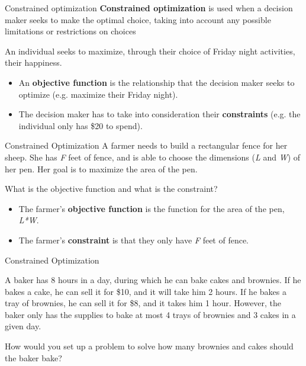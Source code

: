 \documentclass[12pt,t]{beamer}
\begin{document}
\begin{frame}{Constrained optimization}
  \textbf{Constrained optimization} is used when a decision maker seeks to make the optimal choice, taking into account any possible limitations or restrictions on choices

  \bigskip
  
  \bigskip
  An individual seeks to maximize, through their choice of Friday night activities, their happiness.

  \begin{itemize}
    \item An \textbf{objective function} is the relationship that the decision maker seeks to optimize (e.g. maximize their Friday night).
    \item  The decision maker has to take into consideration their \textbf{constraints} (e.g. the individual only has \$20 to spend).
  \end{itemize}
\end{frame}

\begin{frame}{Constrained Optimization}
  A farmer needs to build a rectangular fence for her sheep. She has \textit{F} feet of fence, and is able to choose the dimensions (\textit{L} and \textit{W}) of her pen. Her goal is to maximize the area of the pen.

  \bigskip
  What is the objective function and what is the constraint?

  \pause
  \begin{itemize}
    \item The farmer's \textbf{objective function} is the function for the area of the pen, \textit{L*W}.
    \item The farmer's \textbf{constraint} is that they only have \textit{F} feet of fence.
  \end{itemize}
\end{frame}

\begin{frame}{Constrained Optimization}

  \bigskip
  A baker has 8 hours in a day, during which he can bake cakes and brownies. If he bakes a cake, he can sell it for \$10, and it will take him 2 hours. If he bakes a tray of brownies, he can sell it for \$8, and it takes him 1 hour. However, the baker only has the supplies to bake at most 4 trays of brownies and 3 cakes in a given day. 
  
  \medskip
  How would you set up a problem to solve how many brownies and cakes should the baker bake?
\end{frame}
\end{document}
